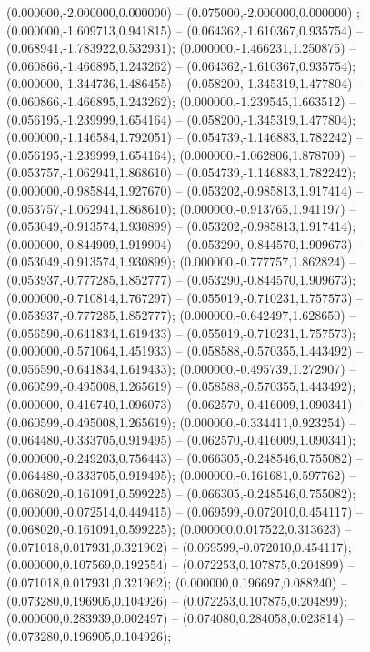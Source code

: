  (0.000000,-2.000000,0.000000) -- (0.075000,-2.000000,0.000000) ;
 (0.000000,-1.609713,0.941815) -- (0.064362,-1.610367,0.935754) -- (0.068941,-1.783922,0.532931);
 (0.000000,-1.466231,1.250875) -- (0.060866,-1.466895,1.243262) -- (0.064362,-1.610367,0.935754);
 (0.000000,-1.344736,1.486455) -- (0.058200,-1.345319,1.477804) -- (0.060866,-1.466895,1.243262);
 (0.000000,-1.239545,1.663512) -- (0.056195,-1.239999,1.654164) -- (0.058200,-1.345319,1.477804);
 (0.000000,-1.146584,1.792051) -- (0.054739,-1.146883,1.782242) -- (0.056195,-1.239999,1.654164);
 (0.000000,-1.062806,1.878709) -- (0.053757,-1.062941,1.868610) -- (0.054739,-1.146883,1.782242);
 (0.000000,-0.985844,1.927670) -- (0.053202,-0.985813,1.917414) -- (0.053757,-1.062941,1.868610);
 (0.000000,-0.913765,1.941197) -- (0.053049,-0.913574,1.930899) -- (0.053202,-0.985813,1.917414);
 (0.000000,-0.844909,1.919904) -- (0.053290,-0.844570,1.909673) -- (0.053049,-0.913574,1.930899);
 (0.000000,-0.777757,1.862824) -- (0.053937,-0.777285,1.852777) -- (0.053290,-0.844570,1.909673);
 (0.000000,-0.710814,1.767297) -- (0.055019,-0.710231,1.757573) -- (0.053937,-0.777285,1.852777);
 (0.000000,-0.642497,1.628650) -- (0.056590,-0.641834,1.619433) -- (0.055019,-0.710231,1.757573);
 (0.000000,-0.571064,1.451933) -- (0.058588,-0.570355,1.443492) -- (0.056590,-0.641834,1.619433);
 (0.000000,-0.495739,1.272907) -- (0.060599,-0.495008,1.265619) -- (0.058588,-0.570355,1.443492);
 (0.000000,-0.416740,1.096073) -- (0.062570,-0.416009,1.090341) -- (0.060599,-0.495008,1.265619);
 (0.000000,-0.334411,0.923254) -- (0.064480,-0.333705,0.919495) -- (0.062570,-0.416009,1.090341);
 (0.000000,-0.249203,0.756443) -- (0.066305,-0.248546,0.755082) -- (0.064480,-0.333705,0.919495);
 (0.000000,-0.161681,0.597762) -- (0.068020,-0.161091,0.599225) -- (0.066305,-0.248546,0.755082);
 (0.000000,-0.072514,0.449415) -- (0.069599,-0.072010,0.454117) -- (0.068020,-0.161091,0.599225);
 (0.000000,0.017522,0.313623) -- (0.071018,0.017931,0.321962) -- (0.069599,-0.072010,0.454117);
 (0.000000,0.107569,0.192554) -- (0.072253,0.107875,0.204899) -- (0.071018,0.017931,0.321962);
 (0.000000,0.196697,0.088240) -- (0.073280,0.196905,0.104926) -- (0.072253,0.107875,0.204899);
 (0.000000,0.283939,0.002497) -- (0.074080,0.284058,0.023814) -- (0.073280,0.196905,0.104926);

